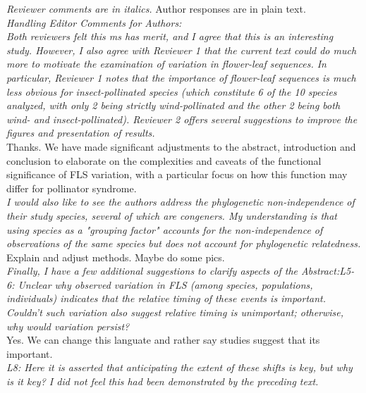 \documentclass[11pt]{article}
\begin{document}
\emph{Reviewer comments are in italics.} Author responses are in plain text.\\

\emph{Handling Editor Comments for Authors:\\
Both reviewers felt this ms has merit, and I agree that this is an interesting study. However, I also agree with Reviewer 1 that the current text could do much more to motivate the examination of variation in flower-leaf sequences. In particular, Reviewer 1 notes that the importance of flower-leaf sequences is much less obvious for insect-pollinated species (which constitute 6 of the 10 species analyzed, with only 2 being strictly wind-pollinated and the other 2 being both wind- and insect-pollinated). Reviewer 2 offers several suggestions to improve the figures and presentation of results.}\\

Thanks. We have made significant adjustments to the abstract, introduction and conclusion to elaborate on the complexities and caveats of the functional significance of FLS variation, with a particular focus on how this function may differ for pollinator syndrome.\\

\emph{I would also like to see the authors address the phylogenetic non-independence of their study species, several of which are congeners. My understanding is that using species as a "grouping factor" accounts for the non-independence of observations of the same species but does not account for phylogenetic relatedness.}\\

Explain and adjust methods. Maybe do some pics.\\

\emph{Finally, I have a few additional suggestions to clarify aspects of the Abstract:L5-6: Unclear why observed variation in FLS (among species, populations, individuals) indicates that the relative timing of these events is important. Couldn't such variation also suggest relative timing is unimportant; otherwise, why would variation persist?}\\

Yes. We can change this languate and rather say studies suggest that its important.\\


\emph{L8: Here it is asserted that anticipating the extent of these shifts is key, but why is it key? I did not feel this had been demonstrated by the preceding text.}\\
\end{document}
